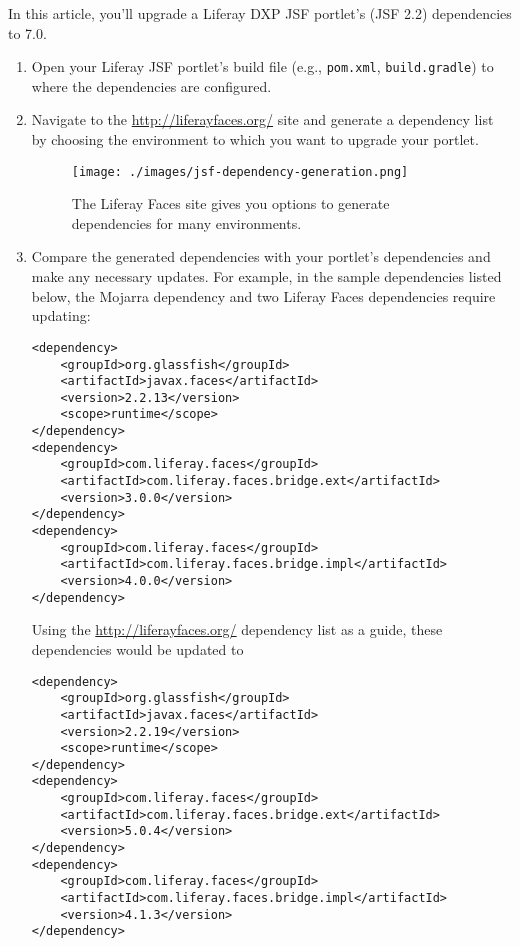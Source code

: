 In this article, you'll upgrade a Liferay DXP JSF portlet's (JSF 2.2)
dependencies to 7.0.

\begin{enumerate}
\def\labelenumi{\arabic{enumi}.}
\item
  Open your Liferay JSF portlet's build file (e.g., \texttt{pom.xml},
  \texttt{build.gradle}) to where the dependencies are configured.
\item
  Navigate to the \url{http://liferayfaces.org/} site and generate a
  dependency list by choosing the environment to which you want to
  upgrade your portlet.

  \begin{figure}
  \centering
  \texttt{[image: ./images/jsf-dependency-generation.png]}
  \caption{The Liferay Faces site gives you options to generate
  dependencies for many environments.}
  \end{figure}
\item
  Compare the generated dependencies with your portlet's dependencies
  and make any necessary updates. For example, in the sample
  dependencies listed below, the Mojarra dependency and two Liferay
  Faces dependencies require updating:

\begin{verbatim}
<dependency>
    <groupId>org.glassfish</groupId>
    <artifactId>javax.faces</artifactId>
    <version>2.2.13</version>
    <scope>runtime</scope>
</dependency>
<dependency>
    <groupId>com.liferay.faces</groupId>
    <artifactId>com.liferay.faces.bridge.ext</artifactId>
    <version>3.0.0</version>
</dependency>
<dependency>
    <groupId>com.liferay.faces</groupId>
    <artifactId>com.liferay.faces.bridge.impl</artifactId>
    <version>4.0.0</version>
</dependency>
\end{verbatim}

  Using the \url{http://liferayfaces.org/} dependency list as a guide,
  these dependencies would be updated to

\begin{verbatim}
<dependency>
    <groupId>org.glassfish</groupId>
    <artifactId>javax.faces</artifactId>
    <version>2.2.19</version>
    <scope>runtime</scope>
</dependency>
<dependency>
    <groupId>com.liferay.faces</groupId>
    <artifactId>com.liferay.faces.bridge.ext</artifactId>
    <version>5.0.4</version>
</dependency>
<dependency>
    <groupId>com.liferay.faces</groupId>
    <artifactId>com.liferay.faces.bridge.impl</artifactId>
    <version>4.1.3</version>
</dependency>
\end{verbatim}
\end{enumerate}

